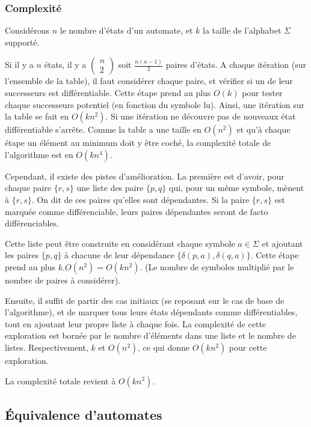 	 \subsubsection{Complexité}
	 
	 Considérons $n$ le nombre d'états d'un automate, et $k$ la taille de l'alphabet $\Sigma$ supporté.
	 
	 Si il y a $n$ états, il y a $\begin{pmatrix}n\\2\end{pmatrix}$ soit $\frac{n(n-1)}{2}$ paires d'états. A chaque itération (sur l'ensemble de la table), il faut considérer chaque paire, et vérifier si un de leur successeurs est différentiable. Cette étape prend au plus $O(k)$ pour tester chaque successeurs potentiel (en fonction du symbole lu).  Ainsi, une itération sur la table se fait en $O(kn^2)$. Si une itération ne découvre pas de nouveaux état différentiable s'arrête. Comme la table a une taille en $O(n^2)$ et qu'à chaque étape un élément au minimum doit y être coché, la complexité totale de l'algorithme est en $O(kn^4)$.
	 
	 Cependant, il existe des pistes d'amélioration. La première est d'avoir, pour chaque paire $\{r,s\}$ une liste des paire $\{p,q\}$ qui, pour un même symbole, mènent à $\{r,s\}$. On dit de ces paires qu'elles sont dépendantes. Si la paire $\{r,s\}$ est marquée comme différenciable, leurs paires dépendantes seront de facto différenciables. 
	 
	 Cette liste peut être construite en considérant chaque symbole $a \in \Sigma$ et ajoutant les paires $\{p,q\}$ à chacune de leur dépendance $\{\delta(p,a),\delta(q,a)\}$. Cette étape prend au plus $k.O(n^2)=O(kn^2)$. (Le nombre de symboles multiplié par le nombre de paires à considérer).
	 
	 Ensuite, il suffit de partir des cas initiaux (se reposant sur le cas de base de l'algorithme), et de marquer tous leurs états dépendants comme différentiables, tout en ajoutant leur propre liste à chaque fois. La complexité de cette exploration est bornée par le nombre d'éléments dans une liste et le nombre de listes. Respectivement, $k$ et $O(n^2)$, ce qui donne $O(kn^2)$ pour cette exploration.
	 
	 La complexité totale revient à $O(kn^2)$.
	 
	 \subsection{Équivalence d'automates}
	 
